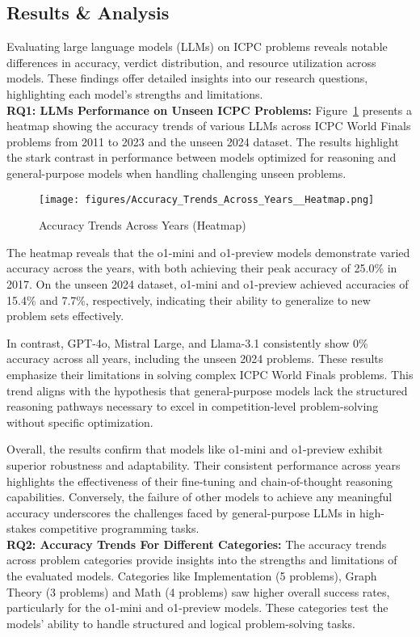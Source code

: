 \subsection{Results \& Analysis}

Evaluating large language models (LLMs) on ICPC problems reveals notable differences in accuracy, verdict distribution, and resource utilization across models. These findings offer detailed insights into our research questions, highlighting each model's strengths and limitations.\\
\textbf{RQ1: LLMs Performance on Unseen ICPC Problems:}
Figure~\ref{fig:accuracy_heatmap} presents a heatmap showing the accuracy trends of various LLMs across ICPC World Finals problems from 2011 to 2023 and the unseen 2024 dataset. The results highlight the stark contrast in performance between models optimized for reasoning and general-purpose models when handling challenging unseen problems.
\begin{figure}[htbp]
    \centering
    \texttt{[image: figures/Accuracy\_Trends\_Across\_Years\_\_Heatmap.png]}
    \caption{Accuracy Trends Across Years (Heatmap)}
    \label{fig:accuracy_heatmap}
\end{figure}

The heatmap reveals that the o1-mini and o1-preview models demonstrate varied accuracy across the years, with both achieving their peak accuracy of 25.0\% in 2017. On the unseen 2024 dataset, o1-mini and o1-preview achieved accuracies of 15.4\% and 7.7\%, respectively, indicating their ability to generalize to new problem sets effectively.

In contrast, GPT-4o, Mistral Large, and Llama-3.1 consistently show 0\% accuracy across all years, including the unseen 2024 problems. These results emphasize their limitations in solving complex ICPC World Finals problems. This trend aligns with the hypothesis that general-purpose models lack the structured reasoning pathways necessary to excel in competition-level problem-solving without specific optimization.

Overall, the results confirm that models like o1-mini and o1-preview exhibit superior robustness and adaptability. Their consistent performance across years highlights the effectiveness of their fine-tuning and chain-of-thought reasoning capabilities. Conversely, the failure of other models to achieve any meaningful accuracy underscores the challenges faced by general-purpose LLMs in high-stakes competitive programming tasks.
\\
\textbf{RQ2: Accuracy Trends For Different Categories:}
The accuracy trends across problem categories provide insights into the strengths and limitations of the evaluated models. Categories like Implementation (5 problems), Graph Theory (3 problems) and Math (4 problems)\cite{Cobbe2021Training} saw higher overall success rates, particularly for the o1-mini and o1-preview models. These categories test the models' ability to handle structured and logical problem-solving tasks.

